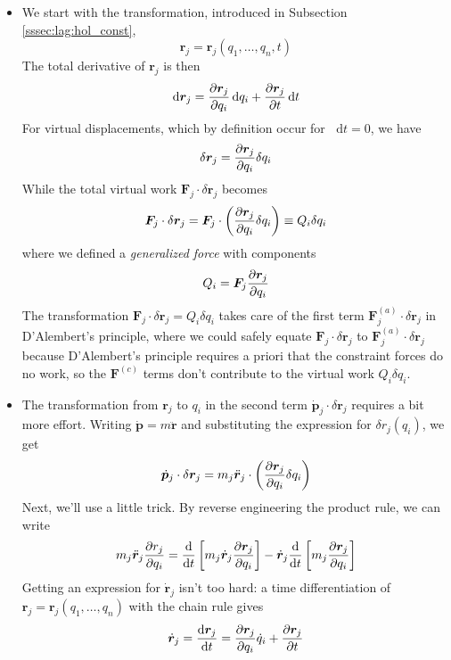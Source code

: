 \documentclass[11pt, a4paper]{article}
\newcommand{\diff}{\mathop{}\!\mathrm{d}} %
\newcommand{\bdot}[1]{\dot{\bm{#1}}} %
\newcommand{\bddot}[1]{\ddot{\bm{#1}}} %
\begin{document}
\begin{itemize}
	\item We start with the transformation, introduced in Subsection \ref{sssec:lag:hol_const},
	\begin{equation*}
		\bm{r}_{j} = \bm{r}_{j}(q_{1}, \ldots, q_{n}, t)
	\end{equation*}
	The total derivative of $ \bm{r}_{j} $ is then
	\begin{equation*}
		\diff \bm{r}_{j} = \pdv{\bm{r}_{j}}{q_{i}}\diff q_{i} + \pdv{\bm{r}_{j}}{t}\diff t
	\end{equation*}
	For virtual displacements, which by definition occur for $ \diff t= 0 $, we have
	\begin{equation*}
		\delta \bm{r}_{j} = \pdv{\bm{r}_{j}}{q_{i}}\delta q_{i}
	\end{equation*}
	While the total virtual work $ \bm{F}_{j} \cdot \delta \bm{r}_{j}$ becomes
	\begin{equation*}
		\bm{F}_{j} \cdot \delta \bm{r}_{j} = \bm{F}_{j} \cdot \left(\pdv{\bm{r}_{j}}{q_{i}}\delta q_{i}\right) \equiv Q_{i} \delta q_{i}
	\end{equation*}
	where we defined a \textit{generalized force} with components
	\begin{equation*}
		Q_{i} = \bm{F}_{j} \pdv{\bm{r}_{j}}{q_{i}}
	\end{equation*}
	The transformation $ \bm{F}_{j} \cdot \delta \bm{r}_{j} = Q_{i} \delta q_{i} $ takes care of the first term $ \bm{F}_{j}^{(a)} \cdot \delta \bm{r}_{j} $ in D'Alembert's principle, where we could safely equate $ \bm{F}_{j} \cdot \delta \bm{r}_{j} $ to $ \bm{F}_{j}^{(a)} \cdot \delta \bm{r}_{j}$ because D'Alembert's principle requires a priori that the constraint forces do no work, so the $ \bm{F}^{(c)} $ terms don't contribute to the virtual work $ Q_{i}\delta q_{i} $.
	
	\item The transformation from $ \bm{r}_{j} $ to $ q_{i} $ in the second term $ \bdot{p}_{j} \cdot \delta \bm{r}_{j} $ requires a bit more effort. Writing $ \bdot{p} = m \bddot{r} $ and substituting the expression for $ \delta r_{j}(q_{i}) $, we get
	\begin{equation*}
		\bdot{p}_{j} \cdot \delta \bm{r}_{j} = m_{j}  \bddot{r}_{j} \cdot \left(\pdv{\bm{r}_{j}}{q_{i}} \delta q_{i}\right)
	\end{equation*}
	Next, we'll use a little trick. By reverse engineering the product rule, we can write
	\begin{equation*}
		m_{j}\bddot{\bm{r}}_{j} \pdv{r_{j}}{q_{i}} = \dv{}{t}\left[m_{j}\bdot{r}_{j}  \pdv{\bm{r}_{j}}{q_{i}} \right] - \bdot{r}_{j} \dv{}{t}\left[m_{j}\pdv{\bm{r}_{j}}{q_{i}} \right]
	\end{equation*}
	Getting an expression for $ \bdot{r}_{j} $ isn't too hard: a time differentiation of $ \bm{r}_{j} = \bm{r}_{j}(q_{1}, \ldots, q_{n})$ with the chain rule gives
	\begin{equation*}
		\bdot{r}_{j} = \dv{\bm{r}_{j}}{t} = \pdv{\bm{r}_{j}}{q_{i}} \dot{q}_{i} + \pdv{\bm{r}_{j}}{t}
	\end{equation*}
	

\end{itemize}
\end{document}
